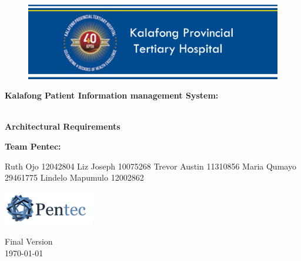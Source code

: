 \begin{titlepage}
	\begin{center}
		
		\begin{figure}
			\centering
			\includegraphics[width=450px]{./Graphics/KPTH_Logo}
		\end{figure}		
		
		\textbf{\LARGE Kalafong Patient Information
		management System:}
		
		\vspace{1 cm}
	    \textbf{\LARGE \\Architectural Requirements}
		
		\vspace{1 cm}
		\LARGE{\textbf{Team Pentec: }}
		

		\begin{flushright} \large
			
			Ruth Ojo 12042804\newline
			Liz Joseph 10075268\newline
			Trevor Austin 11310856\newline
			Maria Qumayo 29461775\newline
			Lindelo Mapumulo 12002862\newline
		\end{flushright}
		
				\vspace{1 cm}
				\centering
				\includegraphics[width=150px]{./Graphics/Pentec_Logo.png}

		
		
		{\LARGE Final Version}
		\\
		{\large \today}		
		
		
	\end{center}
\end{titlepage}
